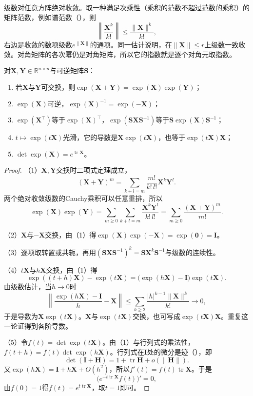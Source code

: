 级数对任意方阵绝对收敛。取一种满足次乘性（乘积的范数不超过范数的乘积）的矩阵范数，例如谱范数（），则
\[
\left\lVert\frac{\bm X^k}{k!}\right\rVert\leq\frac{\lVert\bm X\rVert^k}{k!},
\]
右边是收敛的数项级数$e^{\lVert\bm X\rVert}$的通项。同一估计说明，在$\lVert\bm X\rVert\leq r$上级数一致收敛。对角矩阵的各次幂仍是对角矩阵，所以它的指数就是逐个对角元取指数。

\begin{lemma}[矩阵指数的基本性质]
\label{lem:lie-exponential-properties}
对$\bm X,\bm Y\in\mathbb R^{n\times n}$与可逆矩阵$\bm S$：
\begin{enumerate}
 \item 若$\bm X$与$\bm Y$可交换，则$\exp(\bm X+\bm Y)=\exp(\bm X)\exp(\bm Y)$；
 \item $\exp(\bm X)$可逆，$\exp(\bm X)^{-1}=\exp(-\bm X)$；
 \item $\exp(\bm X^\top)$等于$\exp(\bm X)^\top$，$\exp(\bm S\bm X\bm S^{-1})$等于$\bm S\exp(\bm X)\bm S^{-1}$；
 \item $t\mapsto\exp(t\bm X)$光滑，它的导数是$\bm X\exp(t\bm X)$，也等于$\exp(t\bm X)\bm X$；
 \item $\det\exp(\bm X)=e^{\operatorname{tr}\bm X}$。
\end{enumerate}
\end{lemma}

\begin{proof}
（1）$\bm X,\bm Y$交换时二项式定理成立，
\[
(\bm X+\bm Y)^m=\sum_{k+l=m}\frac{m!}{k!\,l!}\bm X^k\bm Y^l.
\]
两个绝对收敛级数的Cauchy乘积可以任意重排，所以
\[
\exp(\bm X)\exp(\bm Y)
=\sum_{m\geq0}\sum_{k+l=m}\frac{\bm X^k\bm Y^l}{k!\,l!}
=\sum_{m\geq0}\frac{(\bm X+\bm Y)^m}{m!}.
\]

（2）$\bm X$与$-\bm X$交换，由（1）得$\exp(\bm X)\exp(-\bm X)=\exp(\bm0)=\bm I$。

（3）逐项取转置或共轭，再用$(\bm S\bm X\bm S^{-1})^k=\bm S\bm X^k\bm S^{-1}$与级数的连续性。

（4）$t\bm X$与$h\bm X$交换，由（1）得
\[
\exp((t+h)\bm X)-\exp(t\bm X)=\bigl(\exp(h\bm X)-\bm I\bigr)\exp(t\bm X).
\]
由级数估计，当$h\to0$时
\[
\left\lVert\frac{\exp(h\bm X)-\bm I}{h}-\bm X\right\rVert
\leq\sum_{k\geq2}\frac{\lvert h\rvert^{k-1}\lVert\bm X\rVert^k}{k!}\to0,
\]
于是导数为$\bm X\exp(t\bm X)$。$\bm X$与$\exp(t\bm X)$交换，也可写成$\exp(t\bm X)\bm X$。重复这一论证得到各阶导数。

（5）令$f(t)=\det\exp(t\bm X)$。由（1）与行列式的乘法性，$f(t+h)=f(t)\det\exp(h\bm X)$。行列式在$\bm I$处的微分是迹（），即
\[
\det(\bm I+\bm H)=1+\operatorname{tr}\bm H+o(\lVert\bm H\rVert).
\]
又$\exp(h\bm X)=\bm I+h\bm X+O(h^2)$，所以$f'(t)=f(t)\operatorname{tr}\bm X$。于是
\[
\bigl(e^{-t\operatorname{tr}\bm X}f(t)\bigr)'=0,
\]
由$f(0)=1$得$f(t)=e^{t\operatorname{tr}\bm X}$，取$t=1$即可。
\end{proof}


